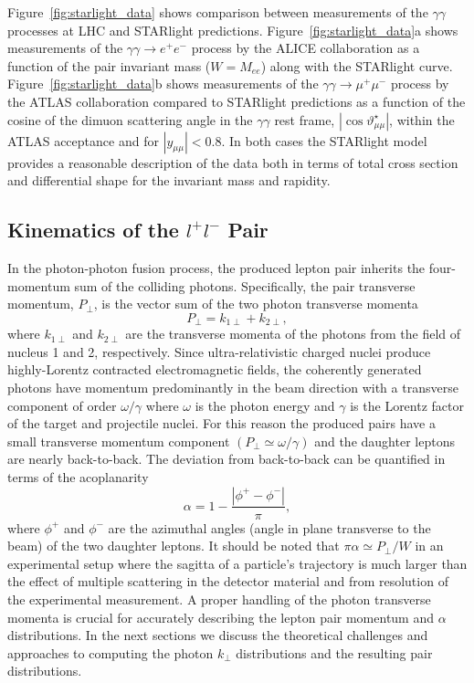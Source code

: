 \documentclass[12pt,epjc3]{svjour3}\sloppy
\begin{document}
Figure~\ref{fig:starlight_data} shows comparison between measurements of the $\gamma\gamma$ processes at LHC and STARlight predictions. 
Figure~\ref{fig:starlight_data}a shows measurements of the $\gamma\gamma \rightarrow e^+e^-$ process by the ALICE collaboration as a function of the pair invariant mass ($W=M_{ee}$) along with the STARlight curve. Figure~\ref{fig:starlight_data}b shows measurements of the $\gamma\gamma \rightarrow \mu^+\mu^-$ process by the ATLAS collaboration compared to STARlight predictions as a function of the cosine of the dimuon scattering angle in the $\gamma\gamma$ rest frame, $|\cos \vartheta^{\star}_{\mu\mu}|$, within the ATLAS acceptance and for $|y_{\mu\mu}|<0.8$. 
In both cases the STARlight model provides a reasonable description of the data both in terms of total cross section and differential shape for the invariant mass and rapidity.

\subsection{Kinematics of the $l^+l^-$ Pair}
\label{sec:kinematics}

In the photon-photon fusion process, the produced lepton pair inherits the four-momentum sum of the colliding photons. Specifically, the pair transverse momentum, $P_\perp$, is the vector sum of the two photon transverse momenta
\begin{equation}
    P_\perp = k_{1\perp} + k_{2\perp},
\end{equation}
where $k_{1\perp}$ and $k_{2\perp}$ are the transverse momenta of the photons from the field of nucleus 1 and 2, respectively.
Since ultra-relativistic charged nuclei produce highly-Lorentz contracted electromagnetic fields, the coherently generated photons have momentum predominantly in the beam direction with a transverse component of order $\omega/\gamma$ where $\omega$ is the photon energy and $\gamma$ is the Lorentz factor of the target and projectile nuclei. For this reason the produced pairs have a small transverse momentum component $(P_\perp \simeq \omega/\gamma)$ and the daughter leptons are nearly back-to-back. The deviation from back-to-back can be quantified in terms of the acoplanarity 
\begin{equation}
    \alpha = 1 - \frac{|\phi^+ - \phi^-|}{\pi},
\end{equation}
where $\phi^+$ and $\phi^-$ are the azimuthal angles (angle in plane transverse to the beam) of the two daughter leptons. It should be noted that $\pi\alpha \simeq P_\perp / W$ in an experimental setup where the sagitta of a particle's trajectory is much larger than the effect of multiple scattering in the detector material and from resolution of the experimental measurement. A proper handling of the photon transverse momenta is crucial for accurately describing the lepton pair momentum and $\alpha$ distributions. In the next sections we discuss the theoretical challenges and approaches to computing the photon $k_\perp$ distributions and the resulting pair distributions. 
\end{document}
